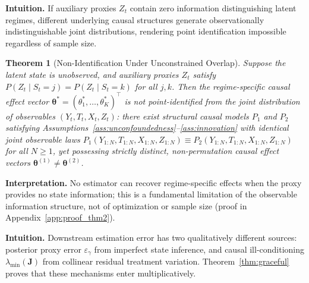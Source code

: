 \documentclass[twoside]{article}
\newtheorem{theorem}{Theorem}
\theoremstyle{definition}
\begin{document}
\textbf{Intuition.} If auxiliary proxies $Z_t$ contain zero information distinguishing latent regimes, different underlying causal structures generate observationally indistinguishable joint distributions, rendering point identification impossible regardless of sample size.

\begin{theorem}[Non-Identification Under Unconstrained Overlap]
\label{thm:impossibility}
Suppose the latent state is unobserved, and auxiliary proxies $Z_t$ satisfy $P(Z_t \mid S_t = j) = P(Z_t \mid S_t = k)$ for all $j, k$. Then the regime-specific causal effect vector $\boldsymbol{\theta}^* = (\theta_1^*, \dots, \theta_K^*)^\top$ is not point-identified from the joint distribution of observables $(Y_t, T_t, X_t, Z_t)$: there exist structural causal models $P_1$ and $P_2$ satisfying Assumptions~\ref{ass:unconfoundedness}--\ref{ass:innovation} with identical joint observable laws $P_1(Y_{1:N}, T_{1:N}, X_{1:N}, Z_{1:N}) \equiv P_2(Y_{1:N}, T_{1:N}, X_{1:N}, Z_{1:N})$ for all $N \ge 1$, yet possessing strictly distinct, non-permutation causal effect vectors $\boldsymbol{\theta}^{(1)} \neq \boldsymbol{\theta}^{(2)}$.
\end{theorem}
\textbf{Interpretation.} No estimator can recover regime-specific effects when the proxy provides no state information; this is a fundamental limitation of the observable information structure, not of optimization or sample size (proof in Appendix~\ref{app:proof_thm2}).

\textbf{Intuition.} Downstream estimation error has two qualitatively different sources: posterior proxy error $\varepsilon_\gamma$ from imperfect state inference, and causal ill-conditioning $\lambda_{\min}(\boldsymbol{J})$ from collinear residual treatment variation. Theorem~\ref{thm:graceful} proves that these mechanisms enter multiplicatively.
\end{document}
